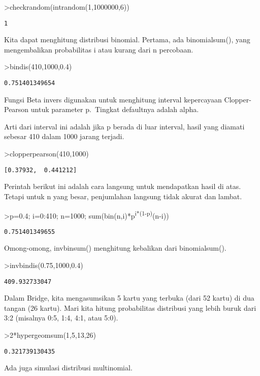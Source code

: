 \documentclass[
]{book}
\begin{document}
\textgreater checkrandom(intrandom(1,1000000,6))

\begin{verbatim}
1
\end{verbatim}

Kita dapat menghitung distribusi binomial. Pertama, ada binomialsum(), yang mengembalikan probabilitas i atau kurang dari n percobaan.

\textgreater bindis(410,1000,0.4)

\begin{verbatim}
0.751401349654
\end{verbatim}

Fungsi Beta invers digunakan untuk menghitung interval kepercayaan Clopper-Pearson untuk parameter p.~Tingkat defaultnya adalah alpha.

Arti dari interval ini adalah jika p berada di luar interval, hasil yang diamati sebesar 410 dalam 1000 jarang terjadi.

\textgreater clopperpearson(410,1000)

\begin{verbatim}
[0.37932,  0.441212]
\end{verbatim}

Perintah berikut ini adalah cara langsung untuk mendapatkan hasil di atas. Tetapi untuk n yang besar, penjumlahan langsung tidak akurat dan lambat.

\textgreater p=0.4; i=0:410; n=1000; sum(bin(n,i)*p\textsuperscript{i*(1-p)}(n-i))

\begin{verbatim}
0.751401349655
\end{verbatim}

Omong-omong, invbinsum() menghitung kebalikan dari binomialsum().

\textgreater invbindis(0.75,1000,0.4)

\begin{verbatim}
409.932733047
\end{verbatim}

Dalam Bridge, kita mengasumsikan 5 kartu yang terbuka (dari 52 kartu) di dua tangan (26 kartu). Mari kita hitung probabilitas distribusi yang lebih buruk dari 3:2 (misalnya 0:5, 1:4, 4:1, atau 5:0).

\textgreater2*hypergeomsum(1,5,13,26)

\begin{verbatim}
0.321739130435
\end{verbatim}

Ada juga simulasi distribusi multinomial.
\end{document}
